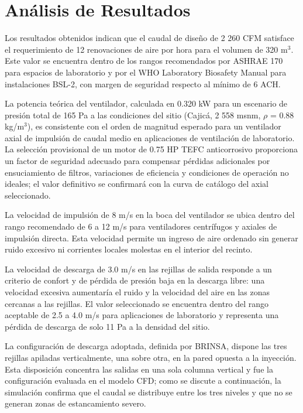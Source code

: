 \section{Análisis de Resultados}\label{sec:analisis}

Los resultados obtenidos indican que el caudal de diseño de 2 260 CFM satisface el requerimiento de 12 renovaciones de aire por hora para el volumen de 320 m$^3$. Este valor se encuentra dentro de los rangos recomendados por ASHRAE 170 para espacios de laboratorio y por el WHO Laboratory Biosafety Manual para instalaciones BSL-2, con margen de seguridad respecto al mínimo de 6 ACH.

La potencia teórica del ventilador, calculada en 0.320 kW para un escenario de presión total de 165 Pa a las condiciones del sitio (Cajicá, 2 558 msnm, $\rho$ = 0.88 kg/m$^3$), es consistente con el orden de magnitud esperado para un ventilador axial de impulsión de caudal medio en aplicaciones de ventilación de laboratorio. La selección provisional de un motor de 0.75 HP TEFC anticorrosivo proporciona un factor de seguridad adecuado para compensar pérdidas adicionales por ensuciamiento de filtros, variaciones de eficiencia y condiciones de operación no ideales; el valor definitivo se confirmará con la curva de catálogo del axial seleccionado.

La velocidad de impulsión de 8 m/s en la boca del ventilador se ubica dentro del rango recomendado de 6 a 12 m/s para ventiladores centrífugos y axiales de impulsión directa. Esta velocidad permite un ingreso de aire ordenado sin generar ruido excesivo ni corrientes locales molestas en el interior del recinto.

La velocidad de descarga de 3.0 m/s en las rejillas de salida responde a un criterio de confort y de pérdida de presión baja en la descarga libre: una velocidad excesiva aumentaría el ruido y la velocidad del aire en las zonas cercanas a las rejillas. El valor seleccionado se encuentra dentro del rango aceptable de 2.5 a 4.0 m/s para aplicaciones de laboratorio y representa una pérdida de descarga de solo 11 Pa a la densidad del sitio.

La configuración de descarga adoptada, definida por BRINSA, dispone las tres rejillas apiladas verticalmente, una sobre otra, en la pared opuesta a la inyección. Esta disposición concentra las salidas en una sola columna vertical y fue la configuración evaluada en el modelo CFD; como se discute a continuación, la simulación confirma que el caudal se distribuye entre los tres niveles y que no se generan zonas de estancamiento severo.

